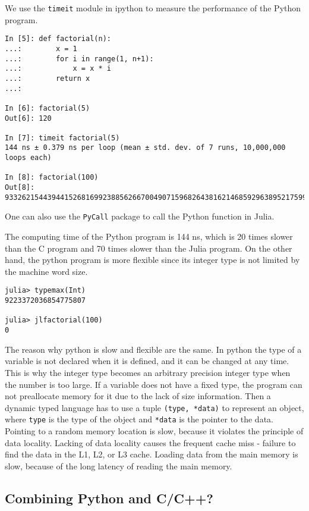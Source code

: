 \documentclass[
  notoc %
]{tufte-book}
\newcommand{\passthrough}[1]{#1}
\begin{document}
We use the \passthrough{\lstinline!timeit!} module in ipython to measure
the performance of the Python program.

\begin{lstlisting}
In [5]: def factorial(n):
...:        x = 1
...:        for i in range(1, n+1):
...:            x = x * i
...:        return x
...:

In [6]: factorial(5)
Out[6]: 120

In [7]: timeit factorial(5)
144 ns ± 0.379 ns per loop (mean ± std. dev. of 7 runs, 10,000,000 loops each)

In [8]: factorial(100)
Out[8]: 93326215443944152681699238856266700490715968264381621468592963895217599993229915608941463976156518286253697920827223758251185210916864000000000000000000000000
\end{lstlisting}

One can also use the \passthrough{\lstinline!PyCall!} package to call
the Python function in Julia.

The computing time of the Python program is 144 ns, which is 20 times
slower than the C program and 70 times slower than the Julia program. On
the other hand, the python program is more flexible since its integer
type is not limited by the machine word size.

\begin{lstlisting}
julia> typemax(Int)
9223372036854775807

julia> jlfactorial(100)
0
\end{lstlisting}

The reason why python is slow and flexible are the same. In python the
type of a variable is not declared when it is defined, and it can be
changed at any time. This is why the integer type becomes an arbitrary
precision integer type when the number is too large. If a variable does
not have a fixed type, the program can not preallocate memory for it due
to the lack of size information. Then a dynamic typed language has to
use a tuple \passthrough{\lstinline!(type, *data)!} to represent an
object, where \passthrough{\lstinline!type!} is the type of the object
and \passthrough{\lstinline!*data!} is the pointer to the data. Pointing
to a random memory location is slow, because it violates the principle
of data locality. Lacking of data locality causes the frequent cache
miss - failure to find the data in the L1, L2, or L3 cache. Loading data
from the main memory is slow, because of the long latency of reading the
main memory.

\hypertarget{combining-python-and-cc}{%
\subsection{Combining Python and C/C++?}\label{combining-python-and-cc}}
\end{document}
